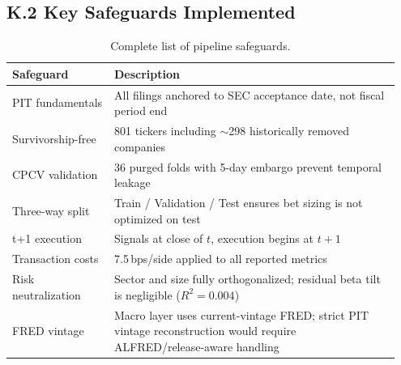 \documentclass[11pt, a4paper]{article}
\begin{document}
\subsection*{K.2 Key Safeguards Implemented}
\begin{table}[h]
\centering
\begin{tabular}{p{0.25\linewidth} p{0.7\linewidth}}
\toprule
\textbf{Safeguard} & \textbf{Description} \\
\midrule
PIT fundamentals & All filings anchored to SEC acceptance date, not fiscal period end \\
Survivorship-free & 801 tickers including $\sim$298 historically removed companies \\
CPCV validation & 36 purged folds with 5-day embargo prevent temporal leakage \\
Three-way split & Train / Validation / Test ensures bet sizing is not optimized on test \\
t+1 execution & Signals at close of $t$, execution begins at $t+1$ \\
Transaction costs & 7.5\,bps/side applied to all reported metrics \\
Risk neutralization & Sector and size fully orthogonalized; residual beta tilt is negligible ($R^2 = 0.004$) \\
FRED vintage & Macro layer uses current-vintage FRED; strict PIT vintage reconstruction would require ALFRED/release-aware handling \\
\bottomrule
\end{tabular}
\caption{Complete list of pipeline safeguards.}
\end{table}
\end{document}
